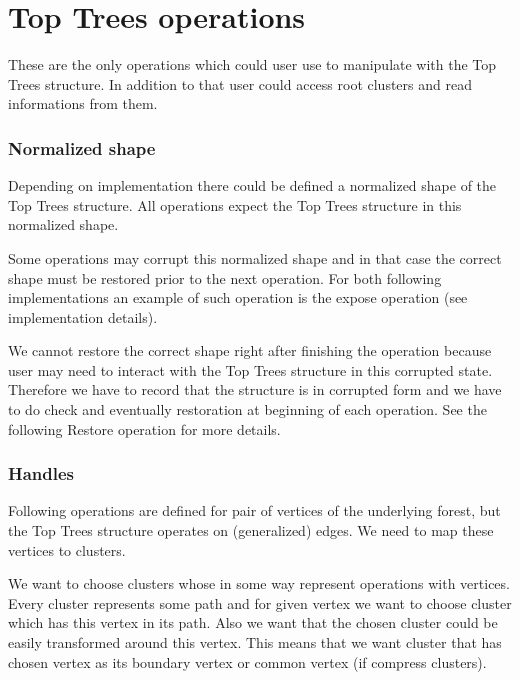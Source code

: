 

\section{Top Trees operations}

These are the only operations which could user use to manipulate with the Top
Trees structure. In addition to that user could access root clusters and read
informations from them.

\subsubsection{Normalized shape}

Depending on implementation there could be defined a normalized shape of the
Top Trees structure. All operations expect the Top Trees structure in this
normalized shape.

Some operations may corrupt this normalized shape and in that case the correct
shape must be restored prior to the next operation. For both following
implementations an example of such operation is the expose operation (see
implementation details).

We cannot restore the correct shape right after finishing the operation because
user may need to interact with the Top Trees structure in this corrupted state.
Therefore we have to record that the structure is in corrupted form and we have
to do check and eventually restoration at beginning of each operation. See the
following {\I Restore} operation for more details.

\subsubsection{Handles}

Following operations are defined for pair of vertices of the underlying forest,
but the Top Trees structure operates on (generalized) edges. We need to map
these vertices to clusters.

We want to choose clusters whose in some way represent operations with
vertices. Every cluster represents some path and for given vertex we want to
choose cluster which has this vertex in its path. Also we want that the chosen
cluster could be easily transformed around this vertex. This means that we want
cluster that has chosen vertex as its boundary vertex or common vertex
(if compress clusters).

